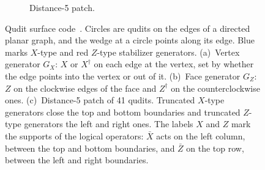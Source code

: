 \begin{figure}[tp]
\begin{minipage}[t]{0.62\textwidth}
\begin{subfigure}[t]{\linewidth}
      \caption{Distance-5 patch.}
      \label{fig:patch}
    \end{subfigure}
  \end{minipage}

  \caption{Qudit surface code~\cite{Moussa2016}. Circles are qudits on the edges of a directed planar graph, and the wedge at a circle points along its edge. Blue marks $X$-type and red $Z$-type stabilizer generators.
  (a)~Vertex generator $G_X$: $X$ or $X^\dagger$ on each edge at the vertex, set by whether the edge points into the vertex or out of it.
  (b)~Face generator $G_Z$: $Z$ on the clockwise edges of the face and $Z^\dagger$ on the counterclockwise ones.
  (c)~Distance-5 patch of 41 qudits. Truncated $X$-type generators close the top and bottom boundaries and truncated $Z$-type generators the left and right ones. The labels $X$ and $Z$ mark the supports of the logical operators: $\bar X$ acts on the left column, between the top and bottom boundaries, and $\bar Z$ on the top row, between the left and right boundaries.}
  \label{fig:qudit-surface-code}
\end{figure}
